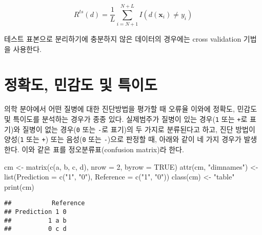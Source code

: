 \documentclass[
]{book}
\newenvironment{Shaded}{\begin{snugshade}}{\end{snugshade}}
\newcommand{\AttributeTok}[1]{\textcolor[rgb]{0.77,0.63,0.00}{#1}}
\newcommand{\ConstantTok}[1]{\textcolor[rgb]{0.00,0.00,0.00}{#1}}
\newcommand{\DecValTok}[1]{\textcolor[rgb]{0.00,0.00,0.81}{#1}}
\newcommand{\FunctionTok}[1]{\textcolor[rgb]{0.00,0.00,0.00}{#1}}
\newcommand{\NormalTok}[1]{#1}
\newcommand{\OtherTok}[1]{\textcolor[rgb]{0.56,0.35,0.01}{#1}}
\newcommand{\StringTok}[1]{\textcolor[rgb]{0.31,0.60,0.02}{#1}}
\begin{document}
\begin{equation}
R^{ts}(d) = \frac{1}{L} \sum_{i = N + 1}^{N + L} I(d(\mathbf{x}_i) \neq y_i)
\label{eq:misclassification-rate-test}
\end{equation}

테스트 표본으로 분리하기에 충분하지 않은 데이터의 경우에는 cross validation 기법을 사용한다.

\hypertarget{precision-sensitivity-specificity}{%
\section{정확도, 민감도 및 특이도}\label{precision-sensitivity-specificity}}

의학 분야에서 어떤 질병에 대한 진단방법을 평가할 때 오류율 이와에 정확도, 민감도 및 특이도를 분석하는 경우가 종종 있다. 실제범주가 질병이 있는 경우(\texttt{1} 또는 \texttt{+}로 표기)와 질병이 없는 경우(\texttt{0} 또는 \texttt{-}로 표기)의 두 가지로 분류된다고 하고, 진단 방법이 양성(\texttt{1} 또는 \texttt{+}) 또는 음성(\texttt{0} 또는 \texttt{-})으로 판정할 때, 아래와 같이 네 가지 경우가 발생한다. 이와 같은 표를 정오분류표(confusion matrix)라 한다.

\begin{Shaded}
\begin{Highlighting}[]
\NormalTok{cm }\OtherTok{\textless{}{-}} \FunctionTok{matrix}\NormalTok{(}\FunctionTok{c}\NormalTok{(}\StringTok{\textquotesingle{}a\textquotesingle{}}\NormalTok{, }\StringTok{\textquotesingle{}b\textquotesingle{}}\NormalTok{, }\StringTok{\textquotesingle{}c\textquotesingle{}}\NormalTok{, }\StringTok{\textquotesingle{}d\textquotesingle{}}\NormalTok{), }\AttributeTok{nrow =} \DecValTok{2}\NormalTok{, }\AttributeTok{byrow =} \ConstantTok{TRUE}\NormalTok{)}
\FunctionTok{attr}\NormalTok{(cm, }\StringTok{"dimnames"}\NormalTok{) }\OtherTok{\textless{}{-}} \FunctionTok{list}\NormalTok{(}\AttributeTok{Prediction =} \FunctionTok{c}\NormalTok{(}\StringTok{"1"}\NormalTok{, }\StringTok{"0"}\NormalTok{), }\AttributeTok{Reference =} \FunctionTok{c}\NormalTok{(}\StringTok{"1"}\NormalTok{, }\StringTok{"0"}\NormalTok{))}
\FunctionTok{class}\NormalTok{(cm) }\OtherTok{\textless{}{-}} \StringTok{"table"}
\FunctionTok{print}\NormalTok{(cm)}
\end{Highlighting}
\end{Shaded}

\begin{verbatim}
##           Reference
## Prediction 1 0
##          1 a b
##          0 c d
\end{verbatim}
\end{document}
